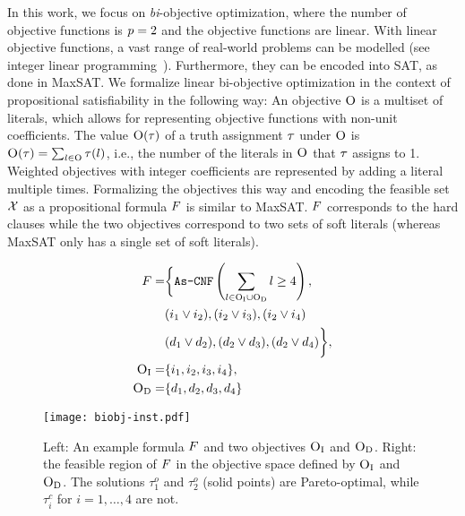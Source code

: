 In this work, we focus on \emph{bi}-objective optimization, where the number of objective functions is $p=2$ and the objective functions are linear.
With linear objective functions, a vast range of real-world problems can be modelled (see integer linear programming~\autocite{ChenEtAl2010-modelling}).
Furthermore, they can be encoded into SAT, as done in MaxSAT.
We formalize linear bi-objective optimization in the context of propositional satisfiability in the following way:
An objective $\textsc{O}$ is a multiset of literals, which allows for representing objective functions with non-unit coefficients.
The value $\textsc{O}(\tau)$ of a truth assignment $\tau$ under $\textsc{O}$ is $\textsc{O}(\tau) = \sum_{l \in \textsc{O}} \tau(l)$, i.e., the number of the literals in $\textsc{O}$ that $\tau$ assigns to 1. 
Weighted objectives with integer coefficients are represented by adding a literal multiple times.
Formalizing the objectives this way and encoding the feasible set $\mathcal{X}$ as a propositional formula $F$ is similar to MaxSAT.
$F$ corresponds to the hard clauses while the two objectives correspond to two sets of soft literals (whereas MaxSAT only has a single set of soft literals).

\begin{figure}
  \begin{minipage}{0.377\textwidth}
    \small
    \begin{align*}
      F = &\bigg\{ \texttt{As-CNF}\left(\sum_ {l \in \textsc{O}_{\text{I}} \cup \textsc{O}_{\text{D}}} l \geq 4 \right), \\
        &(i_1 \lor i_2), (i_2 \lor i_3), (i_2 \lor i_4) \\
        &(d_1 \lor d_2), (d_2 \lor d_3), (d_2 \lor d_4) \bigg\}, \\
      \textsc{O}_{\text{I}} =&\{ i_1, i_2, i_3, i_4 \}, \\
      \textsc{O}_{\text{D}} =&\{ d_1, d_2, d_3, d_4 \} 
    \end{align*}
  \end{minipage}
  \;
  \begin{minipage}{0.605\textwidth}
    \texttt{[image: biobj-inst.pdf]}
  \end{minipage}
  \caption{Left: An example formula $F$ and two objectives $\textsc{O}_{\text{I}}$ and $\textsc{O}_{\text{D}}$.
    Right: the feasible region of $F$ in the objective space defined by $\textsc{O}_{\text{I}}$ and $\textsc{O}_{\text{D}}$.
    The solutions $\tau^o_1$ and $\tau^o_2$ (solid points) are Pareto-optimal, while $\tau^c_i$ for $i=1,\ldots,4$ are not.\label{fig:biobj-inst}}
\end{figure}

